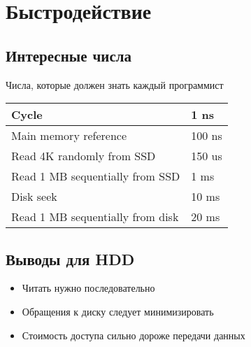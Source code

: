 \documentclass[../lectures.tex]{subfiles}
\begin{document}
\section{Быстродействие}
\subsection{Интересные числа}
\begin{center}
Числа, которые должен знать каждый программист
\begin{tabular}{| l | l |}
    \hline
    Cycle                            & 1   ns \\ \hline
    Main memory reference            & 100 ns \\ \hline
    Read 4K randomly from SSD        & 150 us \\ \hline
    Read 1 MB sequentially from SSD  & 1   ms \\ \hline
    Disk seek                        & 10  ms \\ \hline
    Read 1 MB sequentially from disk & 20  ms \\ \hline
\end{tabular}
\end{center}
\subsection{Выводы для HDD}
\begin{itemize}
    \item Читать нужно последовательно
    \item Обращения к диску следует минимизировать
    \item Стоимость доступа сильно дороже передачи данных
\end{itemize}
\end{document}
